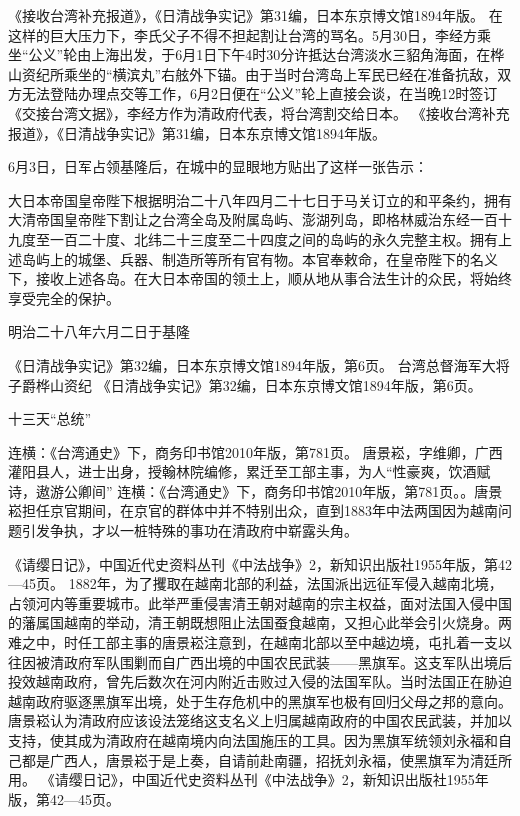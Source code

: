 \documentclass[12pt,UTF8]{ctexbook}
\begin{document}
《接收台湾补充报道》，《日清战争实记》第31编，日本东京博文馆1894年版。
在这样的巨大压力下，李氏父子不得不担起割让台湾的骂名。5月30日，李经方乘坐“公义”轮由上海出发，于6月1日下午4时30分许抵达台湾淡水三貂角海面，在桦山资纪所乘坐的“横滨丸”右舷外下锚。由于当时台湾岛上军民已经在准备抗敌，双方无法登陆办理点交等工作，6月2日便在“公义”轮上直接会谈，在当晚12时签订《交接台湾文据》，李经方作为清政府代表，将台湾割交给日本。 《接收台湾补充报道》，《日清战争实记》第31编，日本东京博文馆1894年版。

6月3日，日军占领基隆后，在城中的显眼地方贴出了这样一张告示：

大日本帝国皇帝陛下根据明治二十八年四月二十七日于马关订立的和平条约，拥有大清帝国皇帝陛下割让之台湾全岛及附属岛屿、澎湖列岛，即格林威治东经一百十九度至一百二十度、北纬二十三度至二十四度之间的岛屿的永久完整主权。拥有上述岛屿上的城堡、兵器、制造所等所有官有物。本官奉敕命，在皇帝陛下的名义下，接收上述各岛。在大日本帝国的领土上，顺从地从事合法生计的众民，将始终享受完全的保护。

明治二十八年六月二日于基隆

《日清战争实记》第32编，日本东京博文馆1894年版，第6页。
台湾总督海军大将子爵桦山资纪 《日清战争实记》第32编，日本东京博文馆1894年版，第6页。

十三天“总统”

连横：《台湾通史》下，商务印书馆2010年版，第781页。
唐景崧，字维卿，广西灌阳县人，进士出身，授翰林院编修，累迁至工部主事，为人“性豪爽，饮酒赋诗，遨游公卿间” 连横：《台湾通史》下，商务印书馆2010年版，第781页。。唐景崧担任京官期间，在京官的群体中并不特别出众，直到1883年中法两国因为越南问题引发争执，才以一桩特殊的事功在清政府中崭露头角。

《请缨日记》，中国近代史资料丛刊《中法战争》2，新知识出版社1955年版，第42—45页。
1882年，为了攫取在越南北部的利益，法国派出远征军侵入越南北境，占领河内等重要城市。此举严重侵害清王朝对越南的宗主权益，面对法国入侵中国的藩属国越南的举动，清王朝既想阻止法国蚕食越南，又担心此举会引火烧身。两难之中，时任工部主事的唐景崧注意到，在越南北部以至中越边境，屯扎着一支以往因被清政府军队围剿而自广西出境的中国农民武装——黑旗军。这支军队出境后投效越南政府，曾先后数次在河内附近击败过入侵的法国军队。当时法国正在胁迫越南政府驱逐黑旗军出境，处于生存危机中的黑旗军也极有回归父母之邦的意向。唐景崧认为清政府应该设法笼络这支名义上归属越南政府的中国农民武装，并加以支持，使其成为清政府在越南境内向法国施压的工具。因为黑旗军统领刘永福和自己都是广西人，唐景崧于是上奏，自请前赴南疆，招抚刘永福，使黑旗军为清廷所用。 《请缨日记》，中国近代史资料丛刊《中法战争》2，新知识出版社1955年版，第42—45页。
\end{document}
